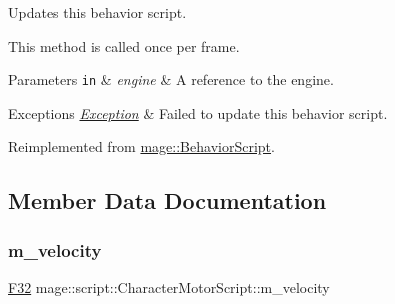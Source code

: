 Updates this behavior script.

This method is called once per frame.


\begin{DoxyParams}[1]{Parameters}
\mbox{\tt in}  & {\em engine} & A reference to the engine. \\
\hline
\end{DoxyParams}

\begin{DoxyExceptions}{Exceptions}
{\em \mbox{\hyperlink{classmage_1_1_exception}{Exception}}} & Failed to update this behavior script. \\
\hline
\end{DoxyExceptions}


Reimplemented from \mbox{\hyperlink{classmage_1_1_behavior_script_a085634661326b59850c1111e537baa4e}{mage\+::\+Behavior\+Script}}.



\subsection{Member Data Documentation}
\mbox{\label{classmage_1_1script_1_1_character_motor_script_a30db45f04bc56380729af037e71ff237}} 
\subsubsection{\texorpdfstring{m\+\_\+velocity}{m\_velocity}}
{\footnotesize\ttfamily \mbox{\hyperlink{namespacemage_aa97e833b45f06d60a0a9c4fc22ae02c0}{F32}} mage\+::script\+::\+Character\+Motor\+Script\+::m\+\_\+velocity\hspace{0.3cm}{\ttfamily [private]}}

